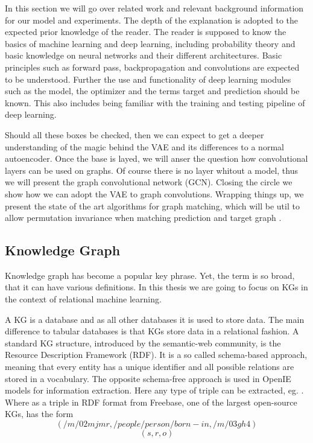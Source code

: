 In this section we will go over related work and relevant background information for our model and experiments. The depth of the explanation is adopted to the expected prior knowledge of the reader. The reader is supposed to know the basics of machine learning and deep learning, including probability theory and basic knowledge on neural networks and their different architectures. Basic principles such as forward pass, backpropagation and convolutions are expected to be understood. Further the use and functionality of deep learning modules such as the model, the optimizer and the terms target and prediction should be known. This also includes being familiar with the training and testing pipeline of deep learning.

Should all these boxes be checked, then we can expect to get a deeper understanding of the magic behind the VAE and its differences to a normal autoencoder. Once the base is layed, we will anser the question how convolutional layers can be used on graphs. Of course there is no layer whitout a model, thus we will present the graph convolutional network (GCN). Closing the circle we show how we can adopt the VAE to graph convolutions. Wrapping things up, we present the state of the art algorithms for graph matching, which will be util to allow permutation invariance when matching prediction and target graph \cite{paulheim_knowledge_2016}.  


\subsection{Knowledge Graph}

Knowledge graph has become a popular key phrase. Yet, the term is so broad, that it can have various definitions. In this thesis we are going to focus on KGs in the context of relational machine learning.

A KG is a database and as all other databases it is used to store data. The main difference to tabular databases is that KGs store data in a relational fashion. A standard KG structure, introduced by the semantic-web community, is the Resource
Description Framework (RDF). It is a so called schema-based approach, meaning that every entity has a unique identifier and all possible relations are stored in a vocabulary. The opposite schema-free approach is used in OpenIE models for information extraction. Here any type of triple can be extracted, eg.  . Where as a triple in RDF format from Freebase, one of the largest open-source KGs, has the form
\begin{equation*}
    (/m/02mjmr, /people/person/born-in, /m/03gh4)
\end{equation*}
%  
\begin{equation*}
    (s, r,  o)
\end{equation*}
 

